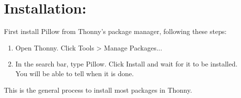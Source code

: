 \documentclass[11pt, letterpaper, onecolumn, oneside, final]{article}
\begin{document}
\maketitle

\section{Installation:}
    First install {\consolas Pillow} from Thonny's package manager, following these steps:
\begin{enumerate}
    \item Open Thonny. Click {\consolas Tools > Manage Packages...}
    \item In the search bar, type {\consolas Pillow}. Click {\consolas Install} and wait for it to be installed. You will be able to tell when it is done.
\end{enumerate}
This is the general process to install most packages in Thonny. 
\end{document}
